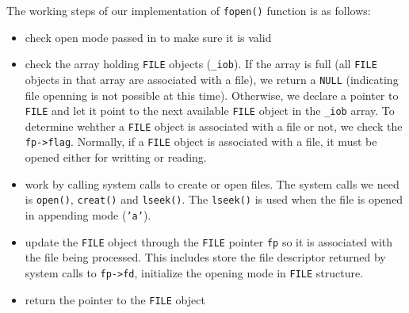 \documentclass[11pt]{article}
\begin{document}
The working steps of our implementation of \texttt{fopen()} function is as follows:
\begin{itemize}
\item check open mode passed in to make sure it is valid
\item check the array holding \texttt{FILE} objects (\texttt{\_iob}). If the array is full (all \texttt{FILE} objects in that array are associated with a file), we return a \texttt{NULL} (indicating file openning is not possible at this time). Otherwise, we declare a pointer to \texttt{FILE} and let it point to the next available \texttt{FILE} object in the \texttt{\_iob} array. To determine wehther a \texttt{FILE} object is associated with a file or not, we check the \texttt{fp->flag}. Normally, if a \texttt{FILE} object is associated with a file, it must be opened either for writting or reading.
\item work by calling system calls to create or open files. The system calls we need is \texttt{open()}, \texttt{creat()} and \texttt{lseek()}. The \texttt{lseek()} is used when the file is opened in appending mode (\texttt{'a'}).
\item update the \texttt{FILE} object through the \texttt{FILE} pointer \texttt{fp} so it is associated with the file being processed. This includes store the file descriptor returned by system calls to \texttt{fp->fd}, initialize the opening mode in \texttt{FILE} structure.
\item return the pointer to the \texttt{FILE} object
\end{itemize}
\end{document}
